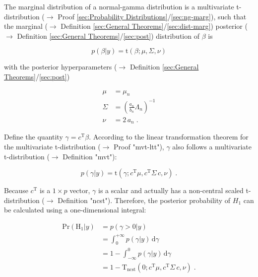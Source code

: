 \documentclass[a4paper,12pt,twoside]{book}
\begin{document}
The marginal distribution of a normal-gamma distribution is a multivariate t-distribution ($\rightarrow$ Proof \ref{sec:Probability Distributions}/\ref{sec:ng-marg}), such that the marginal ($\rightarrow$ Definition \ref{sec:General Theorems}/\ref{sec:dist-marg}) posterior ($\rightarrow$ Definition \ref{sec:General Theorems}/\ref{sec:post}) distribution of $\beta$ is

\begin{equation} \label{eq:blr-pp-GLM-NG-post-beta}
p(\beta|y) = \mathrm{t}(\beta; \mu, \Sigma, \nu)
\end{equation}

with the posterior hyperparameters ($\rightarrow$ Definition \ref{sec:General Theorems}/\ref{sec:post})

\begin{equation} \label{eq:blr-pp-GLM-NG-post-par-beta}
\begin{split}
\mu &= \mu_n \\
\Sigma &= \left( \frac{a_n}{b_n} \Lambda_n \right)^{-1} \\
\nu &= 2 \, a_n \; .
\end{split}
\end{equation}

Define the quantity $\gamma = c^\mathrm{T} \beta$. According to the linear transformation theorem for the multivariate t-distribution ($\rightarrow$ Proof "mvt-ltt"), $\gamma$ also follows a multivariate t-distribution ($\rightarrow$ Definition "mvt"):

\begin{equation} \label{eq:blr-pp-GLM-NG-post-gamma}
p(\gamma|y) = \mathrm{t}(\gamma; c^\mathrm{T} \mu, c^\mathrm{T} \Sigma \, c, \nu) \; .
\end{equation}

Because $c^\mathrm{T}$ is a $1 \times p$ vector, $\gamma$ is a scalar and actually has a non-central scaled t-distribution ($\rightarrow$ Definition "ncst"). Therefore, the posterior probability of $H_1$ can be calculated using a one-dimensional integral:

\begin{equation} \label{eq:blr-pp-GLM-NG-post-prob-H0-s1}
\begin{split}
\mathrm{Pr}\left( \mathrm{H}_1 | y \right) &= p(\gamma > 0|y) \\
&= \int_{0}^{+\infty} p(\gamma|y) \, \mathrm{d}\gamma \\
&= 1 - \int_{-\infty}^{0} p(\gamma|y) \, \mathrm{d}\gamma \\
&= 1 - \mathrm{T}_\mathrm{ncst}(0; c^\mathrm{T} \mu, c^\mathrm{T} \Sigma \, c, \nu) \; .
\end{split}
\end{equation}
\end{document}

